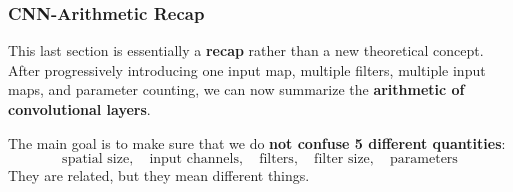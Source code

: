 \subsubsection{CNN-Arithmetic Recap}\label{sec:cnn-arithmetic-recap}

This last section is essentially a \textbf{recap} rather than a new theoretical concept. After progressively introducing one input map, multiple filters, multiple input maps, and parameter counting, we can now summarize the \textbf{arithmetic of convolutional layers}.

\highspace
The main goal is to make sure that we do \textbf{not confuse 5 different quantities}:
\begin{equation*}
    \text{spatial size}, \quad
    \text{input channels}, \quad
    \text{filters}, \quad
    \text{filter size}, \quad
    \text{parameters}
\end{equation*}
They are related, but they mean different things.
